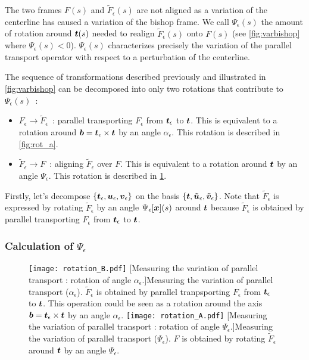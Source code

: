 The two frames $F(s)$ and $\tilde{F}_\epsilon(s)$ are not aligned as a variation of the centerline has caused a variation of the bishop frame. We call $\Psi_\epsilon(s)$ the amount of rotation around $\boldsymbol{t}(s)$ needed to realign $\tilde{F}_\epsilon(s)$ onto $F(s)$ (see \cref{fig:varbishop} where $\Psi_\epsilon(s) < 0$). $\Psi_\epsilon(s)$ characterizes precisely the variation of the parallel transport operator with respect to a perturbation of the centerline.

The sequence of transformations described previously and illustrated in \cref{fig:varbishop} can be decomposed into only two rotations that contribute to $\Psi_\epsilon(s)$~:
\begin{itemize}
\item
$F_\epsilon \rightarrow \tilde{F}_\epsilon$~: parallel transporting $F_\epsilon$ from $\boldsymbol{t}_\epsilon$ to $\boldsymbol{t}$.
This is equivalent to a rotation around $\boldsymbol{b} = \boldsymbol{t}_\epsilon \times \boldsymbol{t}$ by an angle $\alpha_\epsilon$. This rotation is described in \cref{fig:rot_a}.
\item
$\tilde{F}_\epsilon \rightarrow F$~: aligning $\tilde{F}_\epsilon$ over $F$. This is equivalent to a rotation around $\boldsymbol{t}$ by an angle $\Psi_\epsilon$. This rotation is described in \cref{fig:rot_b}.
\end{itemize}
Firstly, let's decompose $\{\boldsymbol{t}_\epsilon, \boldsymbol{u}_\epsilon,\boldsymbol{v}_\epsilon\}$ on the basis $\{\boldsymbol{t}, \boldsymbol{\tilde{u}}_\epsilon,\boldsymbol{\tilde{v}}_\epsilon\}$. Note that $\tilde{F}_\epsilon$ is expressed by rotating $\tilde{F}_\epsilon$ by an angle $\Psi_\epsilon[\boldsymbol{x}](s)$ around $\boldsymbol{t}$ because $\tilde{F}_\epsilon$ is obtained by parallel transporting $F_\epsilon$ from $\boldsymbol{t}_\epsilon$ to $\boldsymbol{t}$.



\subsubsection{Calculation of $\Psi_\epsilon$}

\begin{figure}[p]
\centering
	\texttt{[image: rotation\_B.pdf]}
	[Measuring the variation of parallel transport : rotation of angle $\alpha_\epsilon$.]{Measuring the variation of parallel transport ($\alpha_\epsilon$). $\tilde{F}_\epsilon$ is obtained by parallel tranpsporting $F_\epsilon$ from $\boldsymbol{t}_\epsilon$ to $\boldsymbol{t}$. This operation could be seen as a rotation around the axis $\boldsymbol{b} = \boldsymbol{t}_\epsilon \times \boldsymbol{t}$ by an angle $\alpha_\epsilon$.}
	\label{fig:rot_a}
%
	\texttt{[image: rotation\_A.pdf]}
	[Measuring the variation of parallel transport : rotation of angle $\Psi_\epsilon$.]{Measuring the variation of parallel transport ($\Psi_\epsilon$). $F$ is obtained by rotating $\tilde{F}_\epsilon$ around $\boldsymbol{t}$ by an angle $\Psi_\epsilon$.}
	\label{fig:rot_b}
\end{figure}

